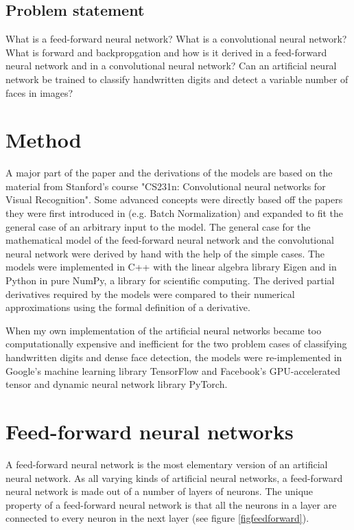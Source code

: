 \documentclass[a4paper, twoside]{article}
\begin{document}
\subsection{Problem statement}
What is a feed-forward neural network? What is a convolutional neural network?
What is forward and backpropgation and how is it derived in a feed-forward neural network and in a convolutional neural network?
Can an artificial neural network be trained to classify handwritten digits and detect a variable number of faces in images?

\section{Method}
A major part of the paper and the derivations of the models are based on the material from Stanford's course "CS231n: Convolutional neural networks for Visual Recognition". Some advanced concepts were directly based off the papers they were first introduced in (e.g. Batch Normalization) and expanded to fit the general case of an arbitrary input to the model. The general case for the mathematical model of the feed-forward neural network and the convolutional neural network were derived by hand with the help of the simple cases. The models were implemented in C++ with the linear algebra library Eigen and in Python in pure NumPy, a library for scientific computing. The derived partial derivatives required by the models were compared to their numerical approximations using the formal definition of a derivative. \cite{cs231n} \cite{batchnorm} \cite{eigen} \cite{numpy}

When my own implementation of the artificial neural networks became too computationally expensive and inefficient for the two problem cases of classifying handwritten digits and dense face detection, the models were re-implemented in Google's machine learning library TensorFlow and Facebook's GPU-accelerated tensor and dynamic neural network library PyTorch. \cite{tensorflow} \cite{pytorch}

\section{Feed-forward neural networks}
A feed-forward neural network is the most elementary version of an artificial neural network. As all varying kinds of artificial neural networks, a feed-forward neural network is made out of a number of layers of neurons. The unique property of a feed-forward neural network is that all the neurons in a layer are connected to every neuron in the next layer (see figure \ref{figfeedforward}). \cite{cs231n}
\end{document}
